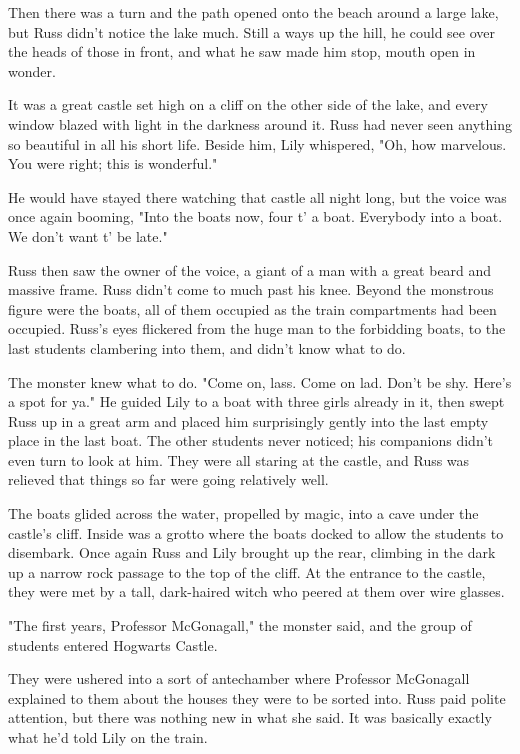 Then there was a turn and the path opened onto the beach around a large lake, but Russ didn't notice the lake much. Still a ways up the hill, he could see over the heads of those in front, and what he saw made him stop, mouth open in wonder.

It was a great castle set high on a cliff on the other side of the lake, and every window blazed with light in the darkness around it. Russ had never seen anything so beautiful in all his short life. Beside him, Lily whispered, "Oh, how marvelous. You were right; this is wonderful."

He would have stayed there watching that castle all night long, but the voice was once again booming, "Into the boats now, four t' a boat. Everybody into a boat. We don't want t' be late."

Russ then saw the owner of the voice, a giant of a man with a great beard and massive frame. Russ didn't come to much past his knee. Beyond the monstrous figure were the boats, all of them occupied as the train compartments had been occupied. Russ's eyes flickered from the huge man to the forbidding boats, to the last students clambering into them, and didn't know what to do.

The monster knew what to do. "Come on, lass. Come on lad. Don't be shy. Here's a spot for ya." He guided Lily to a boat with three girls already in it, then swept Russ up in a great arm and placed him surprisingly gently into the last empty place in the last boat. The other students never noticed; his companions didn't even turn to look at him. They were all staring at the castle, and Russ was relieved that things so far were going relatively well.

The boats glided across the water, propelled by magic, into a cave under the castle's cliff. Inside was a grotto where the boats docked to allow the students to disembark. Once again Russ and Lily brought up the rear, climbing in the dark up a narrow rock passage to the top of the cliff. At the entrance to the castle, they were met by a tall, dark-haired witch who peered at them over wire glasses.

"The first years, Professor McGonagall," the monster said, and the group of students entered Hogwarts Castle.

They were ushered into a sort of antechamber where Professor McGonagall explained to them about the houses they were to be sorted into. Russ paid polite attention, but there was nothing new in what she said. It was basically exactly what he'd told Lily on the train.

